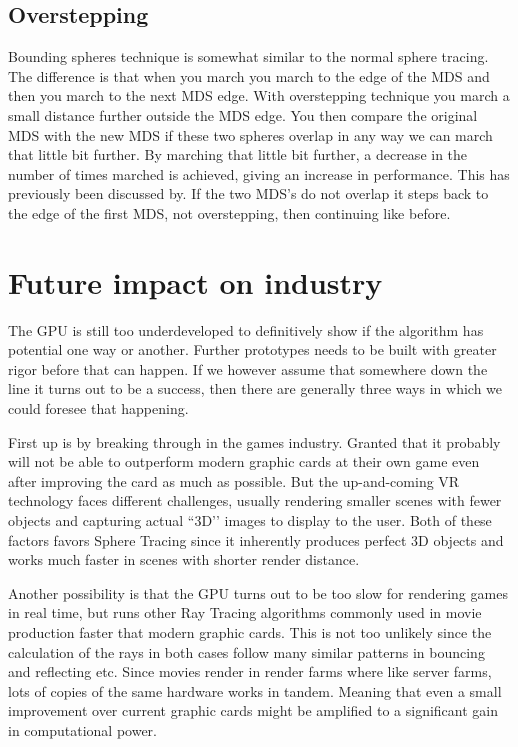 		\subsection{Overstepping}

			Bounding spheres technique is somewhat similar to the normal sphere
			tracing. The difference is that when you march you march to the edge of
			the MDS and then you march to the next MDS edge. With overstepping
			technique you march a small distance further outside the MDS edge. You
			then compare the original MDS with the new MDS if these two spheres
			overlap in any way we can march that little bit further. By marching that
			little bit further, a decrease in the number of times marched is achieved,
			giving an increase in performance. This has previously been discussed
			by\cite{Korndorfer2014}. If the two MDS's do not overlap it steps back to 
			the edge of the first MDS, not overstepping, then continuing like before.
			

		
			
			

	\section{Future impact on industry} 

		The GPU is still too underdeveloped to definitively show if the
		algorithm has potential one way or another.  Further prototypes needs
		to be built with greater rigor before that can happen. If we however
		assume that somewhere down the line it turns out to be a success,
		then there are generally three ways in which we could foresee that
		happening.
		
		First up is by breaking through in the games industry. Granted that
		it probably will not be able to outperform modern graphic cards at
		their own game even after improving the card as much as possible. But
		the up-and-coming VR technology faces different challenges, usually
		rendering smaller scenes with fewer objects and capturing actual
		``3D’’ images to display to the user. Both of these factors favors
		Sphere Tracing since it inherently produces perfect 3D objects and
		works much faster in scenes with shorter render distance.
		
		Another possibility is that the GPU turns out to be too slow for
		rendering games in real time, but runs other Ray Tracing algorithms
		commonly used in movie production faster that modern graphic cards.
		This is not too unlikely since the calculation of the rays in both
		cases follow many similar patterns in bouncing and reflecting etc.
		Since movies render in render farms where like server farms, lots of
		copies of the same hardware works in tandem. Meaning that even a
		small improvement over current graphic cards might be amplified to a
		significant gain in computational power.
		
